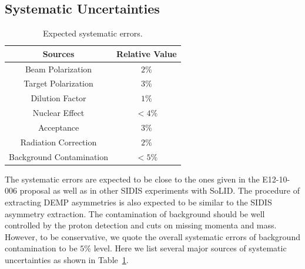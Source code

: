 \subsection{Systematic Uncertainties}

\begin{table}[!htp]
\centering
\begin{tabular}{|c|c|}
\hline
{\bf Sources}            & {\bf Relative Value} \\\hline
Beam Polarization        & $2\%$ \\\hline 
Target Polarization      & $3\%$ \\\hline 
Dilution Factor          & $1\%$ \\\hline 
Nuclear Effect           & $<4\%$ \\\hline 
Acceptance               & $3\%$ \\\hline
Radiation Correction     & $2\%$ \\\hline
Background Contamination & $<5\%$ \\\hline
\end{tabular}
\caption{\footnotesize{Expected systematic errors.}}\label{table:det_sys_err}
\end{table}

The systematic errors are expected to be close to the ones given in the
E12-10-006 proposal as well as in other SIDIS experiments with SoLID. The
procedure of extracting DEMP asymmetries is also expected to be similar to the
SIDIS asymmetry extraction.  The contamination of background should be well
controlled by the proton detection and cuts on missing momenta and mass.
However, to be conservative, we quote the overall systematic errors of
background contamination to be $5\%$ level.  Here we list several major sources
of systematic uncertainties as shown in Table~\ref{table:det_sys_err}.

